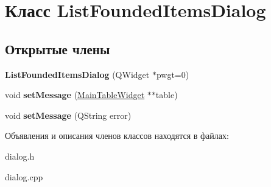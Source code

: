 \hypertarget{class_list_founded_items_dialog}{\section{Класс \-List\-Founded\-Items\-Dialog}
\label{class_list_founded_items_dialog}
}
\subsection*{Открытые члены}
\begin{DoxyCompactItemize}
\item 
\hypertarget{class_list_founded_items_dialog_af851caf3277e1c9e61aa1630234e7f70}{{\bfseries \-List\-Founded\-Items\-Dialog} (\-Q\-Widget $\ast$pwgt=0)}\label{class_list_founded_items_dialog_af851caf3277e1c9e61aa1630234e7f70}

\item 
\hypertarget{class_list_founded_items_dialog_a8988652c7bd10f2a88994c7f6ba29f1c}{void {\bfseries set\-Message} (\hyperlink{class_main_table_widget}{\-Main\-Table\-Widget} $\ast$$\ast$table)}\label{class_list_founded_items_dialog_a8988652c7bd10f2a88994c7f6ba29f1c}

\item 
\hypertarget{class_list_founded_items_dialog_aeeb920e8513f573e50693ffb5b45c822}{void {\bfseries set\-Message} (\-Q\-String error)}\label{class_list_founded_items_dialog_aeeb920e8513f573e50693ffb5b45c822}

\end{DoxyCompactItemize}


Объявления и описания членов классов находятся в файлах\-:\begin{DoxyCompactItemize}
\item 
dialog.\-h\item 
dialog.\-cpp\end{DoxyCompactItemize}
